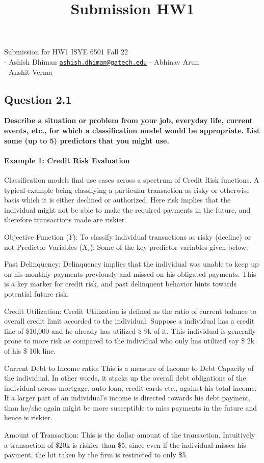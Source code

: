 \documentclass[
]{article}
\title{Submission HW1}
\author{}
\date{\vspace{-2.5em}}
\begin{document}
\maketitle

Submission for HW1 \textbar{} ISYE 6501 \textbar{} Fall 22\\
- Ashish Dhiman \textbar{}
\href{mailto:ashish.dhiman@gatech.edu}{\nolinkurl{ashish.dhiman@gatech.edu}}
- Abhinav Arun \textbar{}\\
- Anshit Verma \textbar{}

\hypertarget{question-2.1}{%
\subsection{Question 2.1}\label{question-2.1}}

\textbf{Describe a situation or problem from your job, everyday life,
current events, etc., for which a classification model would be
appropriate. List some (up to 5) predictors that you might use.}

\hypertarget{example-1-credit-risk-evaluation}{%
\paragraph{Example 1: Credit Risk
Evaluation}\label{example-1-credit-risk-evaluation}}

Classification models find use cases across a spectrum of Credit Risk
functions. A typical example being classifying a particular transaction
as risky or otherwise basis which it is either declined or authorized.
Here risk implies that the individual might not be able to make the
required payments in the future, and therefore transactions made are
riskier.

Objective Function (\(Y\)): To classify individual transactions as risky
(decline) or not Predictor Variables (\(X_i\)): Some of the key
predictor variables given below:

Past Delinquency: Delinquency implies that the individual was unable to
keep up on his monthly payments previously and missed on his obligated
payments. This is a key marker for credit risk, and past delinquent
behavior hints towards potential future risk.

Credit Utilization: Credit Utilization is defined as the ratio of
current balance to overall credit limit accorded to the individual.
Suppose a individual has a credit line of \$10,000 and he already has
utilized \$ 9k of it. This individual is generally prone to more risk as
compared to the individual who only has utilized say \$ 2k of his \$ 10k
line.

Current Debt to Income ratio: This is a measure of Income to Debt
Capacity of the individual. In other words, it stacks up the overall
debt obligations of the individual across mortgage, auto loan, credit
cards etc., against his total income. If a larger part of an
individual's income is directed towards his debt payment, than he/she
again might be more susceptible to miss payments in the future and hence
is riskier.

Amount of Transaction: This is the dollar amount of the transaction.
Intuitively a transaction of \$20k is riskier than \$5, since even if
the individual misses his payment, the hit taken by the firm is
restricted to only \$5.
\end{document}
